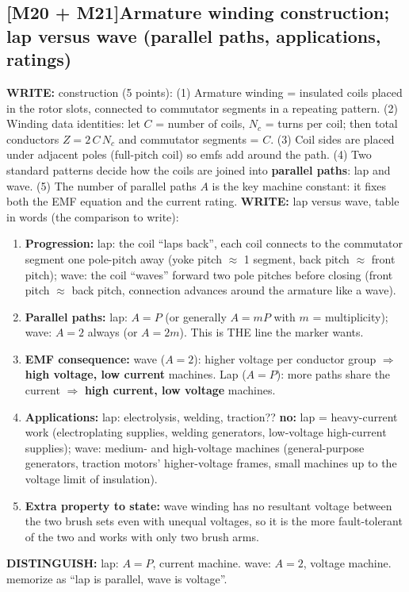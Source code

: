\documentclass[11pt]{article}
\newcommand{\q}[2]{\subsection*{\color{copper}#1\quad\color{iron}#2}}
\newcommand{\w}[1]{\textbf{\color{copper}WRITE:} #1}
\newcommand{\kd}[1]{\textbf{\color{red}DISTINGUISH:} #1}
\begin{document}
\q{[M20 + M21]}{Armature winding construction; lap versus wave (parallel paths, applications, ratings)}
\w{construction (5 points):} (1) Armature winding = insulated coils placed in the rotor slots, connected to commutator segments in a repeating pattern. (2) Winding data identities: let $C$ = number of coils, $N_c$ = turns per coil; then total conductors $Z = 2\, C\, N_c$ and commutator segments = $C$. (3) Coil sides are placed under adjacent poles (full-pitch coil) so emfs add around the path. (4) Two standard patterns decide how the coils are joined into \textbf{parallel paths}: lap and wave. (5) The number of parallel paths $A$ is the key machine constant: it fixes both the EMF equation and the current rating.
\w{lap versus wave, table in words (the comparison to write):}
\begin{enumerate}[label=\arabic*.]
\item \textbf{Progression:} lap: the coil ``laps back'', each coil connects to the commutator segment one pole-pitch away (yoke pitch $\approx$ 1 segment, back pitch $\approx$ front pitch); wave: the coil ``waves'' forward two pole pitches before closing (front pitch $\approx$ back pitch, connection advances around the armature like a wave).
\item \textbf{Parallel paths:} lap: $A = P$ (or generally $A = m P$ with $m$ = multiplicity); wave: $A = 2$ always (or $A = 2 m$). This is THE line the marker wants.
\item \textbf{EMF consequence:} wave ($A = 2$): higher voltage per conductor group $\Rightarrow$ \textbf{high voltage, low current} machines. Lap ($A = P$): more paths share the current $\Rightarrow$ \textbf{high current, low voltage} machines.
\item \textbf{Applications:} lap: electrolysis, welding, traction?? \textbf{no:} lap = heavy-current work (electroplating supplies, welding generators, low-voltage high-current supplies); wave: medium- and high-voltage machines (general-purpose generators, traction motors' higher-voltage frames, small machines up to the voltage limit of insulation).
\item \textbf{Extra property to state:} wave winding has no resultant voltage between the two brush sets even with unequal voltages, so it is the more fault-tolerant of the two and works with only two brush arms.
\end{enumerate}
\kd{lap: $A = P$, current machine. wave: $A = 2$, voltage machine. memorize as ``lap is parallel, wave is voltage''.}
\end{document}
